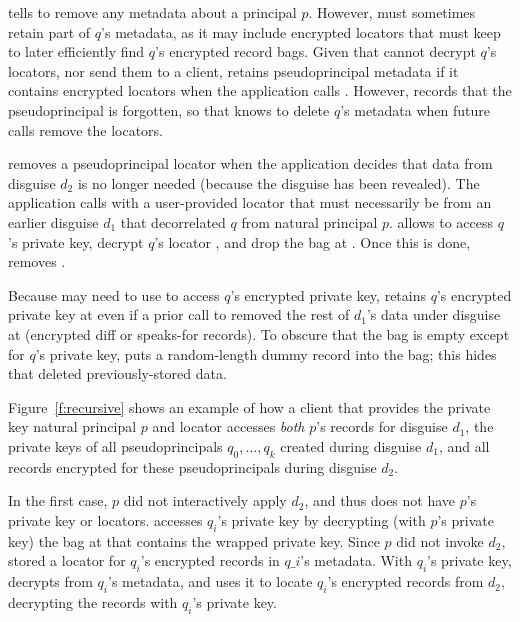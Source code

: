%
 tells \sys to remove any metadata about a principal
$p$.
%
However, \sys must sometimes retain part of $q$'s metadata, as it may include
encrypted locators that \sys must keep to later efficiently find $q$'s
encrypted record bags.
%
Given that \sys cannot decrypt $q$'s locators, nor send them to a
client, \sys retains pseudoprincipal metadata if it contains encrypted locators
when the application calls .
%
However, \sys records that the pseudoprincipal is forgotten, so that \sys
knows to delete $q$'s metadata when future  calls remove
the locators.
%

%
\sys removes a pseudoprincipal locator  when the application
decides that data from disguise $d_2$ is no longer needed (\eg because
the disguise has been revealed).
%
The application calls  with a
user-provided locator that must necessarily be from an earlier disguise
$d_1$ that decorrelated $q$ from natural principal $p$.
%
 allows \sys to access $q$'s private key, decrypt $q$'s locator
, and drop the bag at .
%
Once this is done, \sys removes .
%

%
Because \sys may need to use  to access $q$'s encrypted private key,
\sys retains $q$'s encrypted private key at  even if a prior call to
 removed the rest of $d_1$'s data under
disguise at  (\ie encrypted diff or speaks-for records).
%
To obscure that the bag is empty except for $q$'s private key,
\sys puts a random-length dummy record into the bag; this hides that \sys
deleted previously-stored data.
%
%

%
Figure~\ref{f:recursive} shows an example of how a client that provides
the private key natural principal $p$ and locator  accesses
\emph{both} $p$'s records for disguise $d_1$, the private
keys of all pseudoprincipals ${q_0, \dots, q_k}$ created during disguise
$d_1$, and all records encrypted for these pseudoprincipals during disguise
$d_2$.

%
In the first case, $p$ did not interactively apply $d_2$, and thus \sys does not have $p$'s private
key or locators.
\sys accesses $q_i$'s private key by decrypting (with $p$'s private key) the
bag at  that contains the wrapped private key.
Since $p$ did not invoke $d_2$, \sys stored a locator for $q_i$'s encrypted records
 in $q\_i$'s metadata.
With $q_i$'s private key, \sys decrypts  from $q_i$'s metadata,
and uses it to locate $q_i$'s encrypted records from $d_2$, decrypting the records
with $q_i$'s private key.
%

